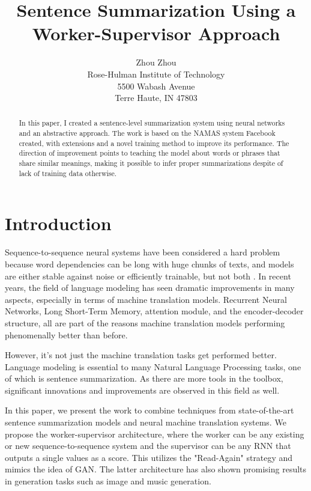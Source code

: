 \documentclass[letterpaper]{article} %
\begin{document}
%
\title{Sentence Summarization Using a Worker-Supervisor Approach}
\author{Zhou Zhou\\
Rose-Hulman Institute of Technology\\
5500 Wabash Avenue\\
Terre Haute, IN 47803\\
}
\maketitle
\begin{abstract}
In this paper, I created a sentence-level summarization system using neural networks and an abstractive approach. The work is based on the NAMAS system Facebook created, with extensions and a novel training method to improve its performance. The direction of improvement points to teaching the model about words or phrases that share similar meanings, making it possible to infer proper summarizations despite of lack of training data otherwise.
\end{abstract}

\section{Introduction}
Sequence-to-sequence neural systems have been considered a hard problem because word dependencies can be long with huge chunks of texts, and models are either stable against noise or efficiently trainable, but not both \cite{bengio1994learning}. In recent years, the field of language modeling has seen dramatic improvements in many aspects, especially in terms of machine translation models. Recurrent Neural Networks, Long Short-Term Memory, attention module, and the encoder-decoder structure, all are part of the reasons machine translation models performing phenomenally better than before.

However, it’s not just the machine translation tasks get performed better. Language modeling is essential to many Natural Language Processing tasks, one of which is sentence summarization. As there are more tools in the toolbox, significant innovations and improvements are observed in this field as well.

In this paper, we present the work to combine techniques from state-of-the-art sentence summarization models and neural machine translation systems. We propose the worker-supervisor architecture, where the worker can be any existing or new sequence-to-sequence system and the supervisor can be any RNN that outputs a single values as a score. This utilizes the "Read-Again" strategy and mimics the idea of GAN. The latter architecture has also shown promising results in generation tasks such as image and music generation.
\end{document}
